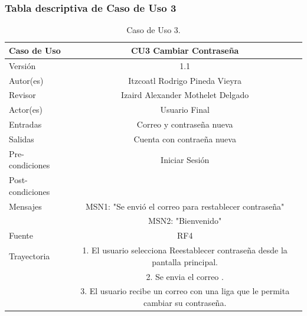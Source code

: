 \documentclass{article}
\begin{document}
\subsubsection{Tabla descriptiva de Caso de Uso 3}
\begin{table}[H]
\caption{Caso de Uso 3.}
\begin{tabular}{|M{5cm}|c|}
\hline
Caso de Uso & CU3 Cambiar Contraseña\\ \hline
Versión & 1.1\\ \hline
Autor(es) & Itzcoatl Rodrigo Pineda Vieyra\\ \hline
Revisor & Izaird Alexander Mothelet Delgado \\ \hline
Actor(es) & Usuario Final \\ \hline
Entradas &  Correo y contraseña nueva \\ \hline
Salidas & Cuenta con contraeña nueva \\ \hline
Pre-condiciones & Iniciar Sesión \\ \hline
Post-condiciones & \\ \hline
Mensajes & MSN1: "Se envió el correo para restablecer contraseña"\\
		   & MSN2: "Bienvenido"\\ \hline
Fuente & RF4 \\ \hline	
	Trayectoria
		& 1.	El usuario selecciona Reestablecer contraseña desde la pantalla principal.\\
		& 2.    Se envia el correo .\\
		& 3.	El usuario recibe un correo con una liga que le permita cambiar su contraseña.\\ \hline
\end{tabular}
\end{table}
\end{document}
